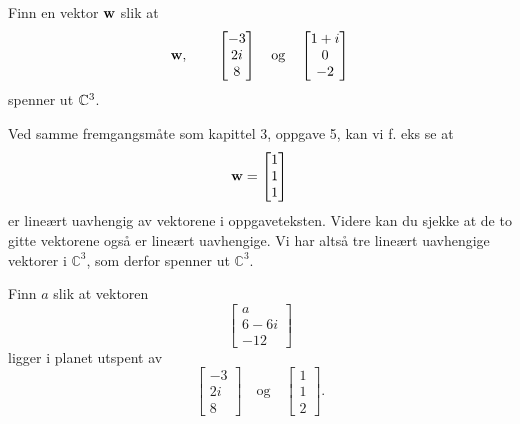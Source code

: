 \begin{oppgave}
Finn en vektor $\mathbf{w}$ slik at
\[
\mathbf{w},
\quad 
\text{}
\quad 
\begin{bmatrix}
-3 \\ 2i \\ 8 
\end{bmatrix}
\quad 
\text{og}
\quad 
\begin{bmatrix}
1+i \\ 0 \\ -2 
\end{bmatrix}
\]
spenner ut $\mathbb{C}^3$.
\end{oppgave}

\begin{losning}
Ved samme fremgangsmåte som kapittel 3, oppgave 5, kan vi f. eks se at
	\begin{equation*}
		\mathbf{w}= \begin{bmatrix} 1 \\ 1 \\ 1 \end{bmatrix}
	\end{equation*}
er lineært uavhengig av vektorene i oppgaveteksten. Videre kan du sjekke at de to gitte vektorene også er lineært uavhengige. Vi har altså tre lineært uavhengige vektorer i $\mathbb{C}^3$, som derfor spenner ut $\mathbb{C}^3$.
\end{losning}


\begin{oppgave}
Finn $a$ slik at vektoren 
\[
\begin{bmatrix}
a \\ 6-6i \\ -12 
\end{bmatrix}
\]
ligger i planet utspent av 
\[
\begin{bmatrix}
-3 \\ 2i \\ 8 
\end{bmatrix}
\quad 
\text{og}
\quad 
\begin{bmatrix}
1 \\ 1 \\ 2 
\end{bmatrix}.
\]

\end{oppgave}


